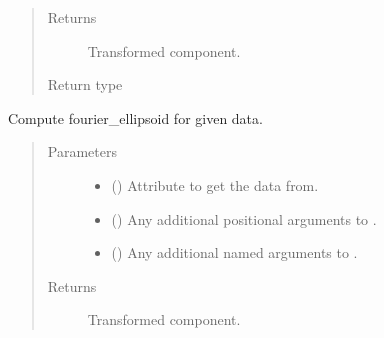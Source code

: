 \documentclass[letterpaper,10pt,english]{sphinxmanual}
\begin{document}
\begin{fulllineitems}
\begin{fulllineitems}
\begin{quote}
\begin{description}
\begin{itemize}
\end{itemize}

\item[{Returns}] \leavevmode
{} \textendash{} Transformed component.

\item[{Return type}] \leavevmode
{\hyperref[\detokenize{api/base_classes:geology.src.base_spatial.SpatialComponent}]{}}

\end{description}\end{quote}

\end{fulllineitems}


\begin{fulllineitems}
\label{\detokenize{api/states:geology.src.States.fourier_ellipsoid}}
Compute fourier\_ellipsoid for given data.
\begin{quote}\begin{description}
\item[{Parameters}] \leavevmode\begin{itemize}
\item {} 
 (\sphinxstyleliteralemphasis{\sphinxupquote{, }}) \textendash{} Attribute to get the data from.

\item {} 
 () \textendash{} Any additional positional arguments to .

\item {} 
 () \textendash{} Any additional named arguments to .

\end{itemize}

\item[{Returns}] \leavevmode
{} \textendash{} Transformed component.


\end{description}
\end{quote}
\end{fulllineitems}
\end{fulllineitems}
\end{document}
